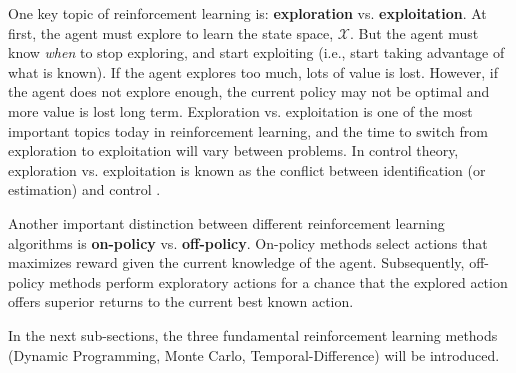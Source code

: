 One key topic of reinforcement learning is: \textbf{exploration} vs. \textbf{exploitation}.  At first, the agent must explore to learn the state space, $\mathcal{X}$.  But the agent must know \textit{when} to stop exploring, and start exploiting (i.e., start taking advantage of what is known).  If the agent explores too much, lots of value is lost.  However, if the agent does not explore enough, the current policy may not be optimal and more value is lost long term.  Exploration vs. exploitation is one of the most important topics today in reinforcement learning, and the time to switch from exploration to exploitation will vary between problems.  In control theory, exploration vs. exploitation is known as the conflict between identification (or estimation) and control \cite{explorevexploitcontrol}.  

Another important distinction between different reinforcement learning algorithms is \textbf{on-policy} vs. \textbf{off-policy}.  On-policy methods select actions that maximizes reward given the current knowledge of the agent.  Subsequently, off-policy methods perform exploratory actions for a chance that the explored action offers superior returns to the current best known action.

In the next sub-sections, the three fundamental reinforcement learning methods (Dynamic Programming, Monte Carlo, Temporal-Difference) will be introduced.
